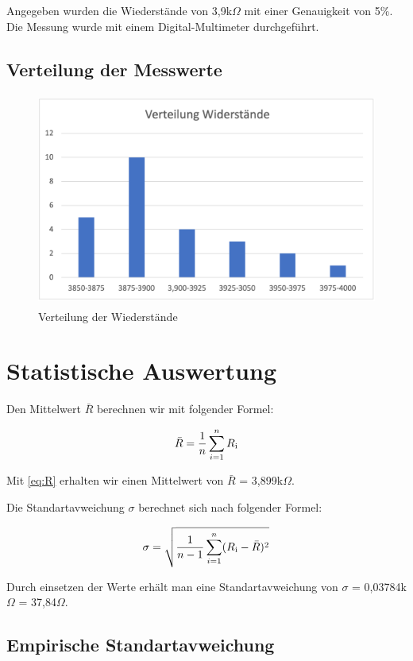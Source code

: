 Angegeben wurden die Wiederstände von 3,9k$\Omega$ mit einer Genauigkeit von 5\%. 
Die Messung wurde mit einem Digital-Multimeter durchgeführt.

\subsection{Verteilung der Messwerte}

\begin{figure}[H]
	\centering
	\includegraphics[height=7cm]{images/Versuch5/Verteilung_Widerstaende.png} 
	\caption{Verteilung der Wiederstände}
	\label{fig: Verteilung der Wiederstände}
\end{figure}

\section{Statistische Auswertung}

Den Mittelwert $\bar{R}$ berechnen wir mit folgender Formel:

\begin{equation}
	\bar{R} = \frac{1}{n} \sum_{i=1}^{n} R\textsubscript{i}
	\label{eq:R}
\end{equation}

Mit \ref*{eq:R} erhalten wir einen Mittelwert von $\bar{R}$ = 3,899k$\Omega$.

Die Standartavweichung $\sigma$ berechnet sich nach folgender Formel:

\begin{equation}
	\sigma = \sqrt{\frac{1}{n-1} \sum_{i=1}^{n} (R\textsubscript{i} - \bar{R})^2}
	\label{eq:Sigma}
\end{equation}

Durch einsetzen der Werte erhält man eine Standartavweichung von $\sigma$ = 0,03784k$\Omega$ 
= 37,84$\Omega$.
\subsection{Empirische Standartavweichung}

